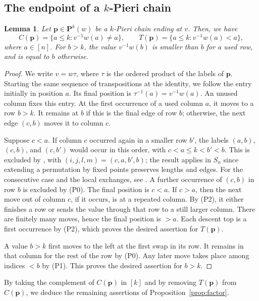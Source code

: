 \documentclass[11pt,a4paper,reqno]{amsart}
\DeclareRobustCommand{\rev}[1]{{\color{revision}#1}}
\numberwithin{equation}{section}
\newtheorem{lemma}[theorem]{Lemma}
\theoremstyle{definition}
\newcommand{\Pieri}{\mathbf P}
\newcommand{\pp}{\mathbf p}
\begin{document}
\subsection{The endpoint of a \texorpdfstring{\(k\)}{k}-Pieri chain}
\begin{lemma}\label{lem:pierend}
Let \(\pp\in\Pieri^k(w)\) be a \(k\)-Pieri chain ending at \(v\). Then, we have 
\[
 C(\pp)=\{a\le k:v^{-1}w(a)\ne a\},\qquad
 T(\pp)=\{a\le k:v^{-1}w(a)<a\},
\]
where \(a\in[n]\). For \(b>k\), the value \(v^{-1}w(b)\) is smaller than \(b\) for a used row, and is equal to \(b\) otherwise.
\end{lemma}
\begin{proof}
\rev{We write \(v=w\tau\), where \(\tau\) is the ordered product of the labels of \(\pp\). Starting the same sequence of transpositions at the identity, we follow the entry initially in position \(a\). Its final position is \(\tau^{-1}(a)=v^{-1}w(a)\). An unused column fixes this entry. At the first occurrence of a used column \(a\), it moves to a row \(b>k\). It remains at \(b\) if this is the final edge of row \(b\); otherwise, the next edge \((c,b)\) moves it to column \(c\).}

\rev{Suppose \(c<a\). If column \(c\) occurred again in a smaller row \(b'\), the labels \((a,b)\), \((c,b)\), and \((c,b')\) would occur in this order, with \(c<a\le k<b'<b\). This is excluded by \cite[Lemma~A.1\,(2)]{NS}, with \((i,j,l,m)=(c,a,b',b)\); the result applies in \(S_n\) since extending a permutation by fixed points preserves lengths and edges. For the consecutive case and the local exchanges, see \cite[Lemmas~A.1\,(1) and~2.3 (1)--(2)]{NS}. A further occurrence of \((c,b)\) in row \(b\) is excluded by (P0).} The final position is \(c<a\). If \(c>a\), then the next move out of column \(c\), if it occurs, is at a repeated column. By (P2), it either finishes a row or sends the value through that row to a still larger column. There are finitely many moves, hence the final position is \(>a\). Each descent top is a first occurrence by (P2), which proves the desired assertion for \(T(\pp)\).

A value \(b>k\) first moves to the left at the first swap in its row. It remains in that column for the rest of the row by (P0). Any later move takes place among indices \(<b\) by (P1). This proves the desired assertion for \(b>k\).
\end{proof}
By taking the complement of \(C(\pp)\) in \([k]\) and by removing \(T(\pp)\) from \(C(\pp)\), we deduce the remaining assertions of Proposition~\ref{prop:factor}.
\end{document}

